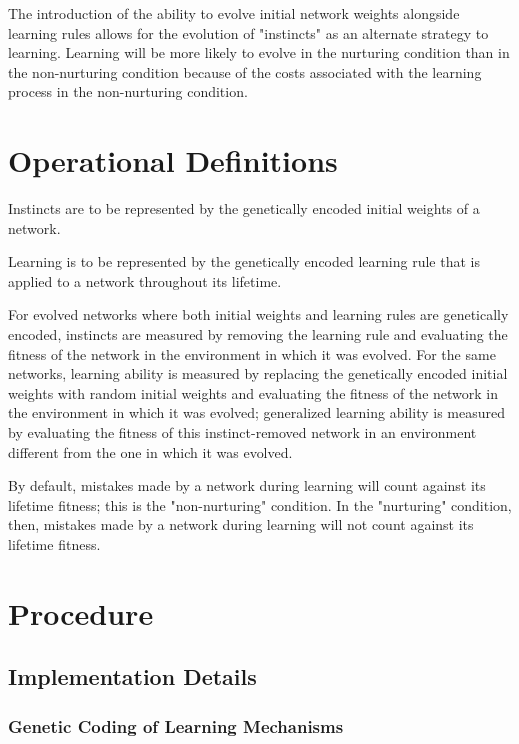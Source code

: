 \documentclass[master]{outhesis}
\begin{document}
The introduction of the ability to evolve initial network weights alongside learning rules allows for the evolution of "instincts" as an alternate strategy to learning. Learning will be more likely to evolve in the nurturing condition than in the non-nurturing condition because of the costs associated with the learning process in the non-nurturing condition. 

\chapter{Operational Definitions}

Instincts are to be represented by the genetically encoded initial weights of a network.

Learning is to be represented by the genetically encoded learning rule that is applied to a network throughout its lifetime.

For evolved networks where both initial weights and learning rules are genetically encoded, instincts are measured by removing the learning rule and evaluating the fitness of the network in the environment in which it was evolved.
For the same networks, learning ability is measured by replacing the genetically encoded initial weights with random initial weights and evaluating the fitness of the network in the environment in which it was evolved; generalized learning ability is measured by evaluating the fitness of this instinct-removed network in an environment different from the one in which it was evolved.

By default, mistakes made by a network during learning will count against its lifetime fitness; this is the "non-nurturing" condition.
In the "nurturing" condition, then, mistakes made by a network during learning will not count against its lifetime fitness.

\chapter{Procedure}

\section{Implementation Details}

\subsection{Genetic Coding of Learning Mechanisms}
\end{document}
